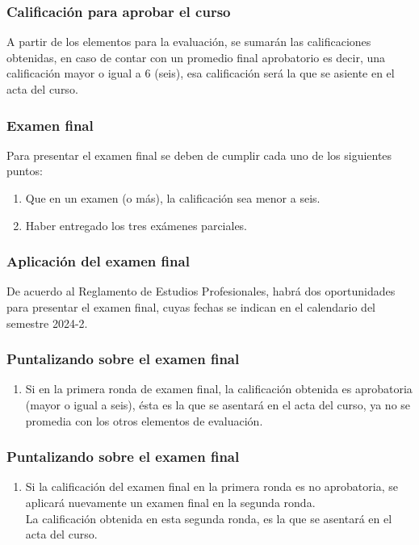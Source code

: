 \documentclass[12pt]{beamer}
\begin{document}
\begin{frame}
\frametitle{Calificación para aprobar el curso}
A partir de los elementos para la evaluación, se sumarán las calificaciones obtenidas, en caso de contar con un promedio final aprobatorio  es decir, una calificación mayor o igual a $6$ (seis), \pause esa calificación será la que se asiente en el acta del curso.
\end{frame}
\begin{frame}
\frametitle{Examen final}
Para presentar el examen final se deben de cumplir cada uno de los siguientes puntos:
\begin{enumerate}[<+->]
\item Que en un examen (o más), la calificación sea menor a seis. %
\item Haber entregado los tres exámenes parciales.
\end{enumerate}
\end{frame}
\begin{frame}
\frametitle{Aplicación del examen final}
De acuerdo al Reglamento de Estudios Profesionales, habrá dos oportunidades para presentar el examen final, cuyas fechas se indican en el calendario del semestre 2024-2.
\end{frame}
\begin{frame}
\frametitle{Puntalizando sobre el examen final}
\begin{enumerate}[<+->]
\item Si en la primera ronda de examen final, la calificación obtenida es aprobatoria (mayor o igual a seis), ésta es la que se asentará en el acta del curso, ya no se promedia con los otros elementos de evaluación.
\seti
\end{enumerate}
\end{frame}
\begin{frame}
\frametitle{Puntalizando sobre el examen final}
\begin{enumerate}[<+->]
\conti    
\item Si la calificación del examen final en la primera ronda es no aprobatoria, se aplicará nuevamente un examen final en la segunda ronda. 
\\
\bigskip
\pause
La calificación obtenida en esta segunda ronda, es la que se asentará en el acta del curso.
\seti
\end{enumerate}
\end{frame}
\end{document}
